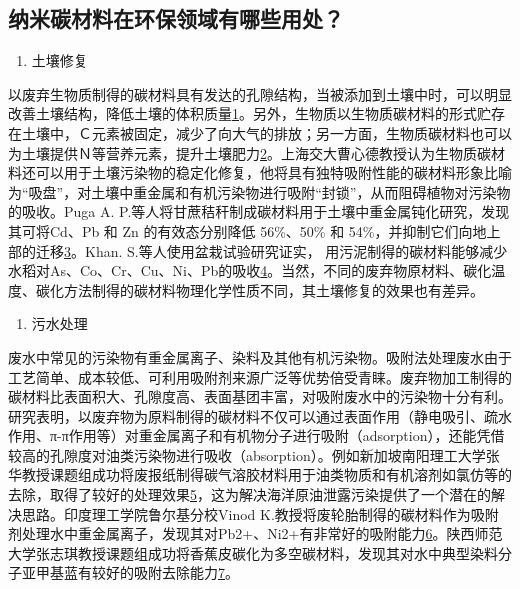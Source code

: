 \documentclass[]{book}
\providecommand{\tightlist}{%
  \setlength{\itemsep}{0pt}\setlength{\parskip}{0pt}}
\begin{document}
\subsection{纳米碳材料在环保领域有哪些用处？}

\begin{enumerate}
\def\labelenumi{\arabic{enumi}.}
\tightlist
\item
  土壤修复
\end{enumerate}

以废弃生物质制得的碳材料具有发达的孔隙结构，当被添加到土壤中时，可以明显改善土壤结构，降低土壤的体积质量\href{陈心想，耿增超。西北农林科技大学学报（自然科学版），2013，41:\%20167-174．}{1}。另外，生物质以生物质碳材料的形式贮存在土壤中，Ｃ元素被固定，减少了向大气的排放；另一方面，生物质碳材料也可以为土壤提供Ｎ等营养元素，提升土壤肥力\href{Kezhen\%20Qian,\%20Ajay\%20Kumar,\%20et.al.\%20Renew.\%20and\%20Sustain.\%20Energy\%20Reviews,\%202015,\%2042:\%201055-1064.}{2}。上海交大曹心德教授认为生物质碳材料还可以用于土壤污染物的稳定化修复，他将具有独特吸附性能的碳材料形象比喻为``吸盘''，对土壤中重金属和有机污染物进行吸附``封锁''，从而阻碍植物对污染物的吸收。Puga
A. P.等人将甘蔗秸秆制成碳材料用于土壤中重金属钝化研究，发现其可将Cd、Pb
和 Zn 的有效态分别降低 56\%、50\% 和
54\%，并抑制它们向地上部的迁移\href{Puga\%20A\%20P,\%20Abreu\%20C\%20A,\%20et\%20al.\%20J.\%20of\%20Environ.\%20Manage.,\%202015,\%20159:\%2086–93.}{3}。Khan.
S.等人使用盆栽试验研究证实，
用污泥制得的碳材料能够减少水稻对As、Co、Cr、Cu、Ni、Pb的吸收\href{Khan\%20S,\%20Cai\%20Chao,\%20et\%20al．\%20Environ.\%20Sci.\%20\&\%20Technol.,\%202013,\%2047\%20:\%208624-8632．}{4}。当然，不同的废弃物原材料、碳化温度、碳化方法制得的碳材料物理化学性质不同，其土壤修复的效果也有差异。

\begin{enumerate}
\def\labelenumi{\arabic{enumi}.}
\setcounter{enumi}{1}
\tightlist
\item
  污水处理
\end{enumerate}

废水中常见的污染物有重金属离子、染料及其他有机污染物。吸附法处理废水由于工艺简单、成本较低、可利用吸附剂来源广泛等优势倍受青睐。废弃物加工制得的碳材料比表面积大、孔隙度高、表面基团丰富，对吸附废水中的污染物十分有利。研究表明，以废弃物为原料制得的碳材料不仅可以通过表面作用（静电吸引、疏水作用、π-π作用等）对重金属离子和有机物分子进行吸附（adsorption），还能凭借较高的孔隙度对油类污染物进行吸收（absorption）。例如新加坡南阳理工大学张华教授课题组成功将废报纸制得碳气溶胶材料用于油类物质和有机溶剂如氯仿等的去除，取得了较好的处理效果\href{Bi\%20H,\%20Huang\%20X,\%20et\%20al.\%20Small\%202014,\%2010,\%203544.}{5}，这为解决海洋原油泄露污染提供了一个潜在的解决思路。印度理工学院鲁尔基分校Vinod
K.教授将废轮胎制得的碳材料作为吸附剂处理水中重金属离子，发现其对Pb2+、Ni2+有非常好的吸附能力\href{Gupta\%20V\%20K,\%20Ganjali\%20M\%20R,\%20et\%20al.\%20Chemical\%20Engineering\%20Journal,\%202012,\%20197:\%20330.}{6}。陕西师范大学张志琪教授课题组成功将香蕉皮碳化为多空碳材料，发现其对水中典型染料分子亚甲基蓝有较好的吸附去除能力\href{Liu\%20R\%20L,\%20Liu\%20Y,\%20et\%20al.\%20Bioresourse\%20Technology\%202014,\%20154:\%20138.}{7}。
\end{document}
